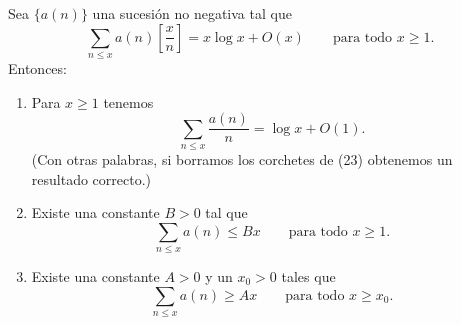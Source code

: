 \documentclass[12pt,a4paper]{book}
\begin{document}
    \begin{teorema}
        Sea $\{a(n)\}$ una sucesión no negativa tal que
        \begin{equation}
            \sum_{n\leq x}a(n)\left[\frac{x}{n}\right]=x\log x+O(x)\qquad\text{para todo } x\geq1.
        \end{equation}
        Entonces:
        \begin{enumerate}
            \item[(a)] Para $x\geq1$ tenemos
            \begin{equation*}
                \sum_{n\leq x}\frac{a(n)}{n}=\log x+O(1).
            \end{equation*}
            (Con otras palabras, si borramos los corchetes de (23) obtenemos un
            resultado correcto.)
            \item[(b)] Existe una constante $B>0$ tal que
            \begin{equation*}
                \sum_{n\leq x}a(n)\leq Bx\qquad\text{para todo } x\geq1.
            \end{equation*}
            \item[(c)] Existe una constante $A>0$ y un $x_{0}>0$ tales que
            \begin{equation*}
                \sum_{n\leq x}a(n)\geq Ax\qquad\text{para todo } x\geq x_{0}.
            \end{equation*}
        \end{enumerate}
    \end{teorema}
\end{document}
